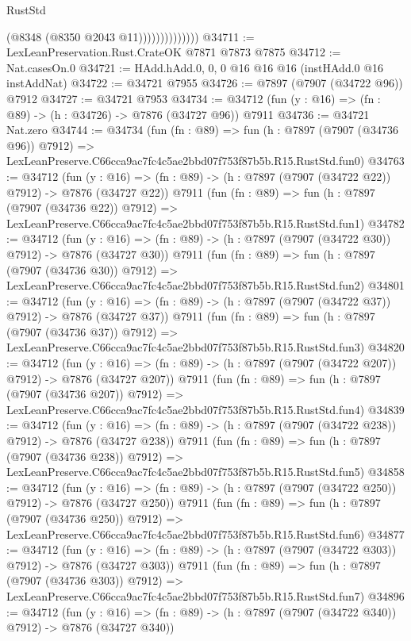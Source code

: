 \begin{lexlean}{RustStd}
\begin{coremodule}
                            (@8348 (@8350 @2043 @11))))))))))))))
@34711 := LexLeanPreservation.Rust.CrateOK @7871 @7873 @7875
@34712 := Nat.casesOn.{0}
@34721 := HAdd.hAdd.{0, 0, 0} @16 @16 @16 (instHAdd.{0} @16 instAddNat)
@34722 := @34721 @7955
@34726 := @7897 (@7907 (@34722 @96)) @7912
@34727 := @34721 @7953
@34734 := @34712 (fun (y : @16) => (fn : @89) -> (h : @34726) -> @7876 (@34727 @96)) @7911
@34736 := @34721 Nat.zero
@34744 := @34734
    (fun (fn : @89) =>
    fun (h : @7897 (@7907 (@34736 @96)) @7912) =>
    LexLeanPreserve.C66cca9ac7fc4c5ae2bbd07f753f87b5b.R15.RustStd.fun0)
@34763 := @34712
    (fun (y : @16) => (fn : @89) -> (h : @7897 (@7907 (@34722 @22)) @7912) -> @7876 (@34727 @22))
    @7911
    (fun (fn : @89) =>
    fun (h : @7897 (@7907 (@34736 @22)) @7912) =>
    LexLeanPreserve.C66cca9ac7fc4c5ae2bbd07f753f87b5b.R15.RustStd.fun1)
@34782 := @34712
    (fun (y : @16) => (fn : @89) -> (h : @7897 (@7907 (@34722 @30)) @7912) -> @7876 (@34727 @30))
    @7911
    (fun (fn : @89) =>
    fun (h : @7897 (@7907 (@34736 @30)) @7912) =>
    LexLeanPreserve.C66cca9ac7fc4c5ae2bbd07f753f87b5b.R15.RustStd.fun2)
@34801 := @34712
    (fun (y : @16) => (fn : @89) -> (h : @7897 (@7907 (@34722 @37)) @7912) -> @7876 (@34727 @37))
    @7911
    (fun (fn : @89) =>
    fun (h : @7897 (@7907 (@34736 @37)) @7912) =>
    LexLeanPreserve.C66cca9ac7fc4c5ae2bbd07f753f87b5b.R15.RustStd.fun3)
@34820 := @34712
    (fun (y : @16) => (fn : @89) -> (h : @7897 (@7907 (@34722 @207)) @7912) -> @7876 (@34727 @207))
    @7911
    (fun (fn : @89) =>
    fun (h : @7897 (@7907 (@34736 @207)) @7912) =>
    LexLeanPreserve.C66cca9ac7fc4c5ae2bbd07f753f87b5b.R15.RustStd.fun4)
@34839 := @34712
    (fun (y : @16) => (fn : @89) -> (h : @7897 (@7907 (@34722 @238)) @7912) -> @7876 (@34727 @238))
    @7911
    (fun (fn : @89) =>
    fun (h : @7897 (@7907 (@34736 @238)) @7912) =>
    LexLeanPreserve.C66cca9ac7fc4c5ae2bbd07f753f87b5b.R15.RustStd.fun5)
@34858 := @34712
    (fun (y : @16) => (fn : @89) -> (h : @7897 (@7907 (@34722 @250)) @7912) -> @7876 (@34727 @250))
    @7911
    (fun (fn : @89) =>
    fun (h : @7897 (@7907 (@34736 @250)) @7912) =>
    LexLeanPreserve.C66cca9ac7fc4c5ae2bbd07f753f87b5b.R15.RustStd.fun6)
@34877 := @34712
    (fun (y : @16) => (fn : @89) -> (h : @7897 (@7907 (@34722 @303)) @7912) -> @7876 (@34727 @303))
    @7911
    (fun (fn : @89) =>
    fun (h : @7897 (@7907 (@34736 @303)) @7912) =>
    LexLeanPreserve.C66cca9ac7fc4c5ae2bbd07f753f87b5b.R15.RustStd.fun7)
@34896 := @34712
    (fun (y : @16) => (fn : @89) -> (h : @7897 (@7907 (@34722 @340)) @7912) -> @7876 (@34727 @340))

\end{coremodule}
\end{lexlean}
